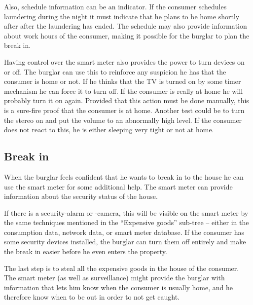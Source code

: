 Also, schedule information can be an indicator.
If the consumer schedules laundering during the night it must indicate that he plans to be home shortly after after the laundering has ended.
The schedule may also provide information about work hours of the consumer, making it possible for the burglar to plan the break in.

Having control over the smart meter also provides the power to turn devices on or off.
The burglar can use this to reinforce any suspicion he has that the consumer is home or not.
If he thinks that the TV is turned on by some timer mechanism he can force it to turn off.
If the consumer is really at home he will probably turn it on again.
Provided that this action must be done manually, this is a sure-fire proof that the consumer is at home.
Another test could be to turn the stereo on and put the volume to an abnormally high level.
If the consumer does not react to this, he is either sleeping very tight or not at home.

\subsection{Break in}
When the burglar feels confident that he wants to break in to the house he can use the smart meter for some additional help.
The smart meter can provide information about the security status of the house.

If there is a security-alarm or -camera, this will be visible on the smart meter by the same techniques mentioned in the ``Expensive goods'' sub-tree -- either in the consumption data, network data, or smart meter database.
If the consumer has some security devices installed, the burglar can turn them off entirely and make the break in easier before he even enters the property.

The last step is to steal all the expensive goods in the house of the consumer.
The smart meter (as well as surveillance) might provide the burglar with information that lets him know when the consumer is usually home, and he therefore know when to be out in order to not get caught.
